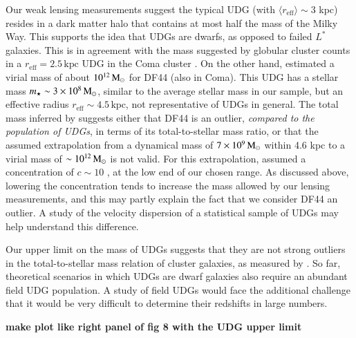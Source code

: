 \documentclass[usenatbib,fleqn]{mnras}
\def\reff{r_\mathrm{eff}}
\begin{document}
Our weak lensing measurements suggest the typical UDG (with $\langle\reff\rangle\sim3$ kpc) resides in a dark matter halo that contains at most half the mass of the Milky Way. This supports the idea that UDGs are dwarfs, as opposed to failed $L^*$ galaxies. This is in agreement with the mass suggested by globular cluster counts in a $\reff=2.5\,\mathrm{kpc}$ UDG in the Coma cluster \citep{beasley16_acs,peng16}. On the other hand, \cite{vandokkum16} estimated a virial mass of about $10^{12}\,\mathrm{M}_\odot$ for DF44 (also in Coma). This UDG has a stellar mass $m_\star\sim3\times10^8\,\mathrm{M}_\odot$, similar to the average stellar mass in our sample, but an effective radius $\reff\sim4.5\,\mathrm{kpc}$, not representative of UDGs in general. The total mass inferred by \cite{vandokkum16} suggests either that DF44 is an outlier, \emph{compared to the population of UDGs}, in terms of its total-to-stellar mass ratio, or that the assumed extrapolation from a dynamical mass of $7\times10^9\,\mathrm{M}_\odot$ within 4.6 kpc to a virial mass of $\sim10^{12}\,\mathrm{M}_\odot$ is not valid. For this extrapolation, \cite{vandokkum16} assumed a concentration of $c\sim10$ \citep{maccio08}, at the low end of our chosen range. As discussed above, lowering the concentration tends to increase the mass allowed by our lensing measurements, and this may partly explain the fact that we consider DF44 an outlier. A study of the velocity dispersion of a statistical sample of UDGs may help understand this difference.

Our upper limit on the mass of UDGs suggests that they are not strong outliers in the total-to-stellar mass relation of cluster galaxies, as measured by \cite{sifon16_satellites}. So far, theoretical scenarios in which UDGs are dwarf galaxies also require an abundant field UDG population. A study of field UDGs would face the additional challenge that it would be very difficult to determine their redshifts in large numbers.

\textbf{make plot like right panel of fig 8 with the UDG upper limit}





\end{document}
